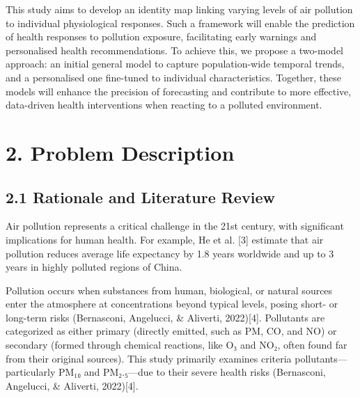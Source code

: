 \documentclass[
]{article}
\begin{document}
This study aims to develop an identity map linking varying levels of air
pollution to individual physiological responses. Such a framework will
enable the prediction of health responses to pollution exposure,
facilitating early warnings and personalised health recommendations. To
achieve this, we propose a two-model approach: an initial general model
to capture population-wide temporal trends, and a personalised one
fine-tuned to individual characteristics. Together, these models will
enhance the precision of forecasting and contribute to more effective,
data-driven health interventions when reacting to a polluted
environment.

\hypertarget{problem-description}{%
\section{\texorpdfstring{2. Problem Description
}{2. Problem Description }}\label{problem-description}}

\hypertarget{rationale-and-literature-review}{%
\subsection{2.1 Rationale and Literature
Review}\label{rationale-and-literature-review}}

Air pollution represents a critical challenge in the 21st century, with
significant implications for human health. For example, He et al.
{[}3{]} estimate that air pollution reduces average life expectancy by
1.8 years worldwide and up to 3 years in highly polluted regions of
China.

Pollution occurs when substances from human, biological, or natural
sources enter the atmosphere at concentrations beyond typical levels,
posing short- or long-term risks (Bernasconi, Angelucci, \& Aliverti,
2022){[}4{]}. Pollutants are categorized as either primary (directly
emitted, such as PM, CO, and NO) or secondary (formed through chemical
reactions, like O₃ and NO₂, often found far from their original
sources). This study primarily examines criteria
pollutants---particularly PM₁₀ and PM₂.₅---due to their severe health
risks (Bernasconi, Angelucci, \& Aliverti, 2022){[}4{]}.
\end{document}
